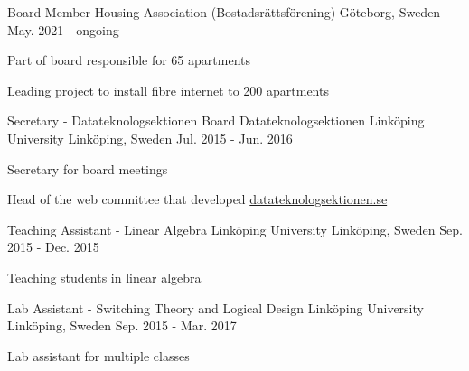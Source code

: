 

\begin{cventries}
  \cventry
    {Board Member} %
    {Housing Association (Bostadsrättsförening)} %
    {Göteborg, Sweden} %
    {May. 2021 - ongoing} %
    {
      \begin{cvitems} %
        \item {Part of board responsible for 65 apartments}
        \item {Leading project to install fibre internet to 200 apartments}
      \end{cvitems}
    }

  \cventry
    {Secretary - Datateknologsektionen Board} %
    {Datateknologsektionen Linköping University} %
    {Linköping, Sweden} %
    {Jul. 2015 - Jun. 2016} %
    {
      \begin{cvitems} %
        \item {Secretary for board meetings}
        \item {Head of the web committee that developed \href{https://d-sektionen.se/}{datateknologsektionen.se}}
      \end{cvitems}
    }

  \cventry
  {Teaching Assistant - Linear Algebra} %
  {Linköping University} %
  {Linköping, Sweden} %
  {Sep. 2015 - Dec. 2015} %
  {
    \begin{cvitems} %
      \item {Teaching students in linear algebra}
    \end{cvitems}
  }


  \cventry
  {Lab Assistant - Switching Theory and Logical Design} %
  {Linköping University} %
  {Linköping, Sweden} %
  {Sep. 2015 - Mar. 2017} %
  {
    \begin{cvitems} %
      \item {Lab assistant for multiple classes}
    \end{cvitems}
  }


\end{cventries}
